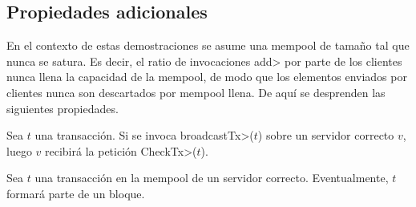 \subsection{Propiedades adicionales}
En el contexto de estas demostraciones
se asume una mempool de tamaño tal que nunca se satura.
Es decir, el ratio de invocaciones \<add> por parte de los clientes nunca
llena la capacidad de la mempool, de modo que los elementos enviados por clientes
nunca son descartados por mempool llena.
De aquí se desprenden las siguientes propiedades.

\begin{property}\label{tendermint:eventual-checktx}
  Sea $t$ una transacción.
  Si se invoca \<broadcastTx>($t$) sobre un servidor correcto $v$, luego
  $v$ recibirá la petición \<CheckTx>($t$).
\end{property}

\begin{property}\label{tendermint:eventual-injection}
  Sea $t$ una transacción en la mempool de un servidor correcto.
  Eventualmente, $t$ formará parte de un bloque.
\end{property}




